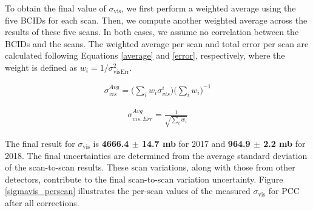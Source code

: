 To obtain the final value of $\sigma_{\text{vis}}$, we first perform a weighted average using the five BCIDs for each scan. Then, we compute another weighted average across the results of these five scans. In both cases, we assume no correlation between the BCIDs and the scans. The weighted average per scan  and total error per scan  are calculated following Equations \ref{average} and \ref{error}, respectively, where the weight is defined as $ w_{i} = 1/\sigma_{\text{visErr}}^{2} $. 


\begin{eqnarray}
\sigma_{vis}^{Avg}=\Biggl(\displaystyle\sum_{i} w_{i}\sigma_{vis}^{i} \Biggr)\Biggl( \displaystyle\sum_{i} w_{i} \Biggr)^{-1}
\label{average}
\end{eqnarray}

\begin{eqnarray}
\sigma_{vis,Err}^{Avg}=\frac{1}{\sqrt{ \displaystyle\sum_{i} w_{i}}} 
\label{error}
\end{eqnarray}


The final result for $\sigma_{\text{vis}}$ is \textbf{4666.4 $\pm$ 14.7 mb} for 2017 and \textbf{964.9 $\pm$ 2.2 mb} for 2018. The final uncertainties are determined from the average standard deviation of the scan-to-scan results. These scan variations, along with those from other detectors, contribute to the final scan-to-scan variation uncertainty. Figure \ref{sigmavis_perscan} illustrates the per-scan values of the measured $\sigma_{\text{vis}}$ for PCC after all corrections. %



